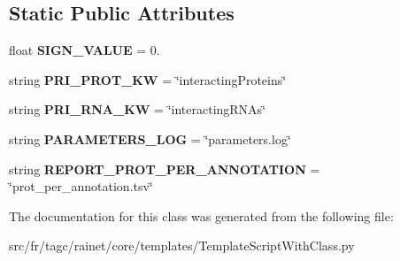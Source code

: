 \subsection*{Static Public Attributes}
\begin{DoxyCompactItemize}
\item 
\hypertarget{classsrc_1_1fr_1_1tagc_1_1rainet_1_1core_1_1templates_1_1TemplateScriptWithClass_1_1TemplateScriptWithClass_ad787e8c47a6c3b2f72ac62f3623849db}{float {\bfseries S\-I\-G\-N\-\_\-\-V\-A\-L\-U\-E} = 0.}\label{classsrc_1_1fr_1_1tagc_1_1rainet_1_1core_1_1templates_1_1TemplateScriptWithClass_1_1TemplateScriptWithClass_ad787e8c47a6c3b2f72ac62f3623849db}

\item 
\hypertarget{classsrc_1_1fr_1_1tagc_1_1rainet_1_1core_1_1templates_1_1TemplateScriptWithClass_1_1TemplateScriptWithClass_a257446e6fe77eb6450f90b8d301efbe9}{string {\bfseries P\-R\-I\-\_\-\-P\-R\-O\-T\-\_\-\-K\-W} = \char`\"{}interacting\-Proteins\char`\"{}}\label{classsrc_1_1fr_1_1tagc_1_1rainet_1_1core_1_1templates_1_1TemplateScriptWithClass_1_1TemplateScriptWithClass_a257446e6fe77eb6450f90b8d301efbe9}

\item 
\hypertarget{classsrc_1_1fr_1_1tagc_1_1rainet_1_1core_1_1templates_1_1TemplateScriptWithClass_1_1TemplateScriptWithClass_a21ee38d45a2e92fab09c860a7cdf495f}{string {\bfseries P\-R\-I\-\_\-\-R\-N\-A\-\_\-\-K\-W} = \char`\"{}interacting\-R\-N\-As\char`\"{}}\label{classsrc_1_1fr_1_1tagc_1_1rainet_1_1core_1_1templates_1_1TemplateScriptWithClass_1_1TemplateScriptWithClass_a21ee38d45a2e92fab09c860a7cdf495f}

\item 
\hypertarget{classsrc_1_1fr_1_1tagc_1_1rainet_1_1core_1_1templates_1_1TemplateScriptWithClass_1_1TemplateScriptWithClass_a1092d4f6cd612ccd6ba7f8a8a6eaabb7}{string {\bfseries P\-A\-R\-A\-M\-E\-T\-E\-R\-S\-\_\-\-L\-O\-G} = \char`\"{}parameters.\-log\char`\"{}}\label{classsrc_1_1fr_1_1tagc_1_1rainet_1_1core_1_1templates_1_1TemplateScriptWithClass_1_1TemplateScriptWithClass_a1092d4f6cd612ccd6ba7f8a8a6eaabb7}

\item 
\hypertarget{classsrc_1_1fr_1_1tagc_1_1rainet_1_1core_1_1templates_1_1TemplateScriptWithClass_1_1TemplateScriptWithClass_a50a601406f8f217f9064b64d68a219a9}{string {\bfseries R\-E\-P\-O\-R\-T\-\_\-\-P\-R\-O\-T\-\_\-\-P\-E\-R\-\_\-\-A\-N\-N\-O\-T\-A\-T\-I\-O\-N} = \char`\"{}prot\-\_\-per\-\_\-annotation.\-tsv\char`\"{}}\label{classsrc_1_1fr_1_1tagc_1_1rainet_1_1core_1_1templates_1_1TemplateScriptWithClass_1_1TemplateScriptWithClass_a50a601406f8f217f9064b64d68a219a9}

\end{DoxyCompactItemize}


The documentation for this class was generated from the following file\-:\begin{DoxyCompactItemize}
\item 
src/fr/tagc/rainet/core/templates/Template\-Script\-With\-Class.\-py\end{DoxyCompactItemize}
